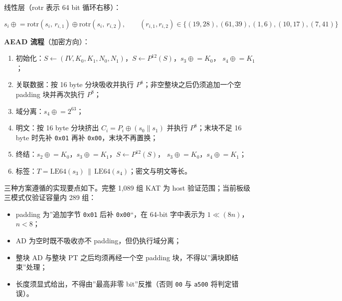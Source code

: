 \Needspace{93pt}

线性层（\(\mathrm{rotr}\) 表示 64 bit 循环右移）：

\[
s_i \mathrel{\oplus}= \mathrm{rotr}(s_i,\,r_{i,1}) \mathrel{\oplus} \mathrm{rotr}(s_i,\,r_{i,2}),
\qquad (r_{i,1},r_{i,2}) \in \{(19,28),(61,39),(1,6),(10,17),(7,41)\}
\]

\textbf{AEAD 流程}（加密方向）：

\begin{enumerate}
\def\labelenumi{\arabic{enumi}.}
\tightlist
\item
  初始化：\(S \gets (IV,K_0,K_1,N_0,N_1)\)，\(S \gets P^{12}(S)\)，\(s_3 \mathrel{\oplus}= K_0\)， \(s_4 \mathrel{\oplus}= K_1\)；
\item
  关联数据：按 16 byte 分块吸收并执行 \(P^8\)；非空整块之后仍须追加一个空 padding 块并再次执行 \(P^8\)；
\item
  域分离：\(s_4 \mathrel{\oplus}= 2^{63}\)；
\item
  明文：按 16 byte 分块挤出 \(C_i = P_i \oplus (s_0 \| s_1)\) 并执行 \(P^8\)；末块不足 16 byte 时先补 \texttt{0x01} 再补 \texttt{0x00}，末块不再置换；
\item
  终结：\(s_2 \mathrel{\oplus}= K_0\)，\(s_3 \mathrel{\oplus}= K_1\)，\(S \gets P^{12}(S)\)， \(s_3 \mathrel{\oplus}= K_0\)，\(s_4 \mathrel{\oplus}= K_1\)；
\item
  标签：\(T = \mathrm{LE64}(s_3) \,\|\, \mathrm{LE64}(s_4)\)；密文与明文等长。
\end{enumerate}

三种方案遵循的实现要点如下。完整 1,089 组 KAT 为 host 验证范围；当前板级三模式仅验证容量内 289 组：

\begin{itemize}
\tightlist
\item
  padding 为''追加字节 \texttt{0x01} 后补 \texttt{0x00}``，在 64-bit 字中表示为 \(1 \ll (8n)\)，\(n<8\)；
\item
  AD 为空时既不吸收亦不 padding，但仍执行域分离；
\item
  整块 AD 与整块 PT 之后均须再经一个空 padding 块，不得以''满块即结束''处理；
\item
  长度须显式给出，不得由''最高非零 bit''反推（否则 \texttt{00} 与 \texttt{a500} 将判定错误）。
\end{itemize}


